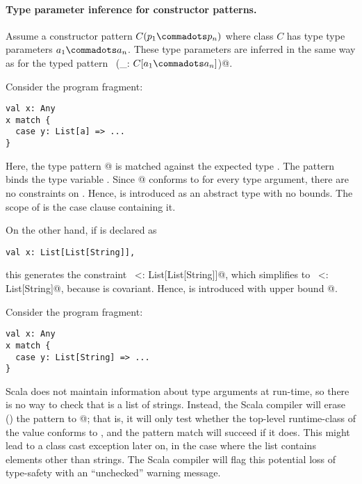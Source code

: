 \paragraph{Type parameter inference for constructor patterns.}
Assume a constructor pattern $C(p_1 \commadots p_n)$ where class $C$
has type type parameters $a_1 \commadots a_n$.  These type parameters
are inferred in the same way as for the typed pattern
~\lstinline@(_: $C[a_1 \commadots a_n]$)@.

\example
Consider the program fragment:
\begin{lstlisting}
val x: Any
x match {
  case y: List[a] => ...
}
\end{lstlisting}
Here, the type pattern \lstinline@List[a]@ is matched against the
expected type \lstinline@Any@. The pattern binds the type variable
\lstinline@a@.  Since \lstinline@List[a]@ conforms to \lstinline@Any@
for every type argument, there are no constraints on \lstinline@a@.
Hence, \lstinline@a@ is introduced as an abstract type with no
bounds. The scope of \lstinline@a@ is the case clause containing it.

On the other hand, if \lstinline@x@ is declared as
\begin{lstlisting}
val x: List[List[String]],
\end{lstlisting}
this generates the constraint 
~\lstinline@List[a] <: List[List[String]]@, which simplifies to 
~\lstinline@a <: List[String]@, because \lstinline@List@ is covariant. Hence,
\lstinline@a@ is introduced with upper bound
\lstinline@List[String]@.

\example
Consider the program fragment: 
\begin{lstlisting}
val x: Any
x match {
  case y: List[String] => ...
}
\end{lstlisting}
Scala does not maintain information about type arguments at run-time,
so there is no way to check that \lstinline@x@ is a list of strings.
Instead, the Scala compiler will erase () the
pattern to \lstinline@List[_]@; that is, it will only test whether the
top-level runtime-class of the value \lstinline@x@ conforms to
\lstinline@List@, and the pattern match will succeed if it does.  This
might lead to a class cast exception later on, in the case where the
list \lstinline@x@ contains elements other than strings.  The Scala
compiler will flag this potential loss of type-safety with an
``unchecked'' warning message.

